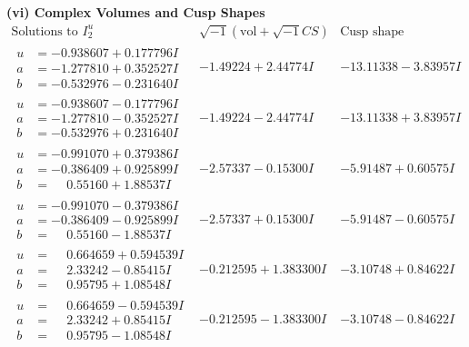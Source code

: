 \documentclass[1p]{elsarticle_modified}
\theoremstyle{definition}
\newcommand{\I}{\sqrt{-1}}
\begin{document}
\newpage\flushleft \textbf{(vi) Complex Volumes and Cusp Shapes}
$$\begin{array}{c|c|c}  
\text{Solutions to }I^u_{2}& \I (\text{vol} + \sqrt{-1}CS) & \text{Cusp shape}\\
 \hline 
\begin{aligned}
u &= -0.938607 + 0.177796 I \\
a &= -1.277810 + 0.352527 I \\
b &= -0.532976 - 0.231640 I\end{aligned}
 & -1.49224 + 2.44774 I & -13.11338 - 3.83957 I \\ \hline\begin{aligned}
u &= -0.938607 - 0.177796 I \\
a &= -1.277810 - 0.352527 I \\
b &= -0.532976 + 0.231640 I\end{aligned}
 & -1.49224 - 2.44774 I & -13.11338 + 3.83957 I \\ \hline\begin{aligned}
u &= -0.991070 + 0.379386 I \\
a &= -0.386409 + 0.925899 I \\
b &= \phantom{-}0.55160 + 1.88537 I\end{aligned}
 & -2.57337 - 0.15300 I & -5.91487 + 0.60575 I \\ \hline\begin{aligned}
u &= -0.991070 - 0.379386 I \\
a &= -0.386409 - 0.925899 I \\
b &= \phantom{-}0.55160 - 1.88537 I\end{aligned}
 & -2.57337 + 0.15300 I & -5.91487 - 0.60575 I \\ \hline\begin{aligned}
u &= \phantom{-}0.664659 + 0.594539 I \\
a &= \phantom{-}2.33242 - 0.85415 I \\
b &= \phantom{-}0.95795 + 1.08548 I\end{aligned}
 & -0.212595 + 1.383300 I & -3.10748 + 0.84622 I \\ \hline\begin{aligned}
u &= \phantom{-}0.664659 - 0.594539 I \\
a &= \phantom{-}2.33242 + 0.85415 I \\
b &= \phantom{-}0.95795 - 1.08548 I\end{aligned}
 & -0.212595 - 1.383300 I & -3.10748 - 0.84622 I \\ \hline\begin{aligned}

\end{aligned}
\end{array}$$
\end{document}
